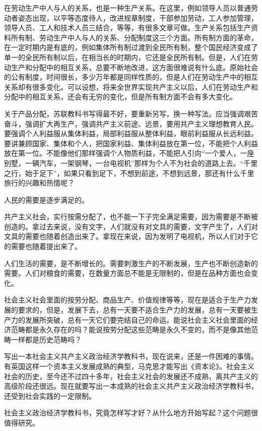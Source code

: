 在劳动生产中人与人的关系，也是一种生产关系。在这里，例如领导人员以普通劳动者姿态出现，以平等态度待人，改进规章制度，干部参加劳动，工人参加管理，领导人员、工人和技术人员三结合，等等，有很多文章可做。生产关系包括生产资料所有制、劳动生产中人与人的关系、分配制度这三个方面。所有制方面的革命，在一定时期内是有底的，例如集体所有制过渡到全民所有制，整个国民经济变成了单一的全民所有制以后，在相当长的时期内，它还是全民所有制。但是，人们在劳动生产和分配中的相互关系，总要不断地改进，这方面很难说有什么底。原始社会的公有制度，时间很长，多少万年都是同样性质的，但是人们在劳动生产中的相互关系却有很多变化。可以设想，将来全世界实现共产主义以后，人们在劳动生产和分配中的相互关系，还会有无穷的变化，但是所有制方面不会有多大变化。

关于产品分配，苏联教科书写得最不好，要重新另写，换一种写法。应当强调艰苦奋斗，强调扩大再生产，强调共产主义前途、远景，要用共产主义理想教育人民。要强调个人利益服从集体利益，局部利益服从整体利益，眼前利益服从长远利益。要讲兼顾国家、集体和个人，把国家利益、集体利益放在第一位，不能把个人利益放在第一位。不能像他们那样强调个人物质利益，不能把人引向“一个爱人，一座别墅，一辆汽车，一架钢琴，一台电视机”那样为个人不为社会的道路上去。“千里之行，始于足下”，如果只看到足下，不想到前途，不想到远景，那还有什么千里旅行的兴趣和热情呢？

人民的需要是逐步满足的。

共产主义社会，实行按需分配了，也不能一下子完全满足需要，因为需要是不断被创造的。拿过去来说，没有文字，人们就没有对文具的需要，文字产生了，人们对文具的需要也随着创造出来了。拿现在来说，因为发明了电视机，所以人们对于它的需要也随着提出来了。

人们生活的需要，是不断增长的。需要刺激生产的不断发展，生产也不断创造新的需要。人们对粮食的需要，在数量方面总不能是无限制的，但是在品种方面也会变化。

社会主义社会里面的按劳分配、商品生产、价值规律等等，现在是适合于生产力发展的要求的，但是，发展下去，总有一天要不适合生产力的发展，总有一天要被生产力的发展所突破，总有一天它们要完结自己的命运。能说社会主义社会里面的经济范畴都是永久存在的吗？能说按劳分配这些范畴是永久不变的，而不是像其他范畴一样都是历史范畴吗？

写出一本社会主义共产主义政治经济学教科书，现在说来，还是一件困难的事情。有英国这样一个资本主义发展成熟的典型，马克思才能写出《资本论》。社会主义社会的历史，至今还不过四十多年，社会主义社会的发展还不成熟，离共产主义的高级阶段还很远。现在就要写出一本成熟的社会主义共产主义政治经济学教科书，还受到社会实践的一定限制。

社会主义政治经济学教科书，究竟怎样写才好？从什么地方开始写起？这个问题很值得研究。


